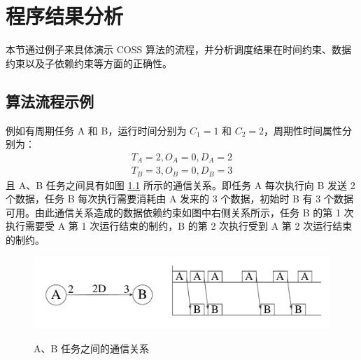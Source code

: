 
\chapter{程序结果分析}


本节通过例子来具体演示 COSS 算法的流程，并分析调度结果在时间约束、数据约束以及子依赖约束等方面的正确性。
\section{算法流程示例}


例如有周期任务 A 和 B，运行时间分别为 $C_1=1$ 和 $C_2=2$，周期性时间属性分别为：
\begin{gather*}
  T_A=2, O_A=0, D_A=2 \\
  T_B=3, O_B=0, D_B=3
\end{gather*}
且 A、B 任务之间具有如图 \ref{program-fig-sample-SDF} 所示的通信关系。即任务 A 每次执行向 B 发送 2 个数据，任务 B 每次执行需要消耗由 A 发来的 3 个数据，初始时 B 有 3 个数据可用。由此通信关系造成的数据依赖约束如图中右侧关系所示，任务 B 的第 1 次执行需要受 A 第 1 次运行结束的制约，B 的第 2 次执行受到 A 第 2 次运行结束的制约。

\begin{figure}[!hbt]
  \centering
  \includegraphics[height=12ex]{figure/program-sample-SDF.pdf}\\
  \caption{A、B 任务之间的通信关系}\label{program-fig-sample-SDF}
\end{figure}

